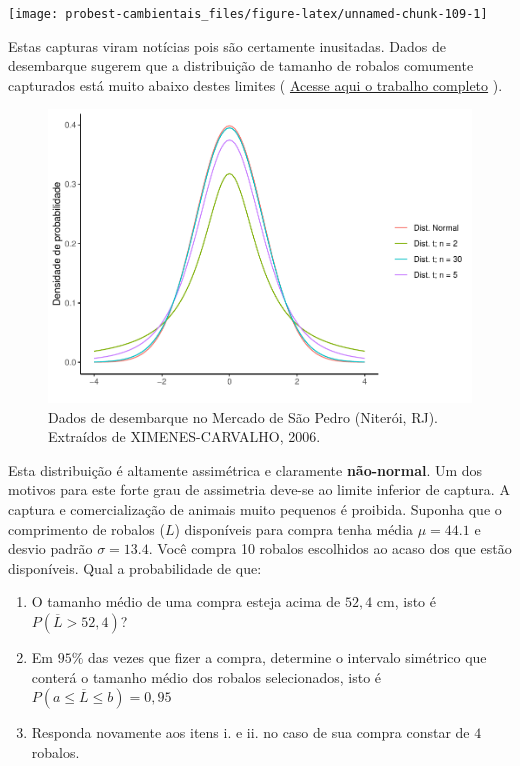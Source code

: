 \documentclass[
]{book}
\providecommand{\tightlist}{%
  \setlength{\itemsep}{0pt}\setlength{\parskip}{0pt}}
\begin{document}
\texttt{[image: probest-cambientais\_files/figure-latex/unnamed-chunk-109-1]}

Estas capturas viram notícias pois são certamente inusitadas. Dados de desembarque sugerem que a distribuição de tamanho de robalos comumente capturados está muito abaixo destes limites \citep{ximanes-carvalo2006} ( \href{http://repositorio.ufc.br/bitstream/riufc/1312/1/2006_dis_moxcarvalho.pdf}{Acesse aqui o trabalho completo} ).

\begin{figure}
\centering
\includegraphics{probest-cambientais_files/figure-latex/unnamed-chunk-111-1.pdf}
\caption{\label{fig:unnamed-chunk-111}Dados de desembarque no Mercado de São Pedro (Niterói, RJ). Extraídos de XIMENES-CARVALHO, 2006.}
\end{figure}

Esta distribuição é altamente assimétrica e claramente \textbf{não-normal}. Um dos motivos para este forte grau de assimetria deve-se ao limite inferior de captura. A captura e comercialização de animais muito pequenos é proibida. Suponha que o comprimento de robalos (\(L\)) disponíveis para compra tenha média \(\mu = 44.1\) e desvio padrão \(\sigma = 13.4\). Você compra 10 robalos escolhidos ao acaso dos que estão disponíveis. Qual a probabilidade de que:

\begin{enumerate}
\def\labelenumi{\roman{enumi}.}
\tightlist
\item
  O tamanho médio de uma compra esteja acima de \(52,4\) cm, isto é \(P(\overline{L} > 52,4)\)?
\item
  Em \(95\%\) das vezes que fizer a compra, determine o intervalo simétrico que conterá o tamanho médio dos robalos selecionados, isto é \(P(a \le \overline{L} \le b) = 0,95\)
\item
  Responda novamente aos itens i. e ii. no caso de sua compra constar de \(4\) robalos.
\end{enumerate}
\end{document}
